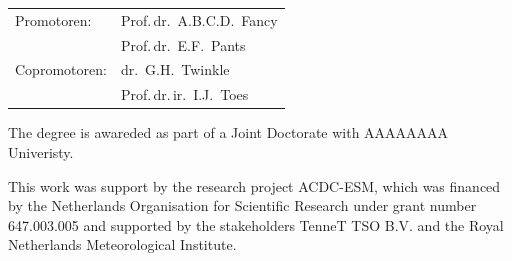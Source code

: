\begin{titlepage}


        \clearpage

        \thispagestyle{empty}

	\begin{tabular}{ll}
		Promotoren:           & Prof.\,dr.\ A.B.C.D.~Fancy \\[0.1cm]
                                                & Prof.\,dr.\ E.F.~Pants \\[0.1cm]
		Copromotoren:      & dr.\ G.H.~Twinkle \\[0.1cm]
                                                & Prof.\,dr.\,ir.\ I.J.~Toes
	\end{tabular}

        \vfill

        \noindent The degree is awareded as part of a Joint Doctorate with AAAAAAAA Univeristy.

        \vspace*{2\bigskipamount}

        \noindent This work was support by the research project ACDC-ESM, which was financed by the Netherlands Organisation for Scientific Research under grant number 647.003.005 and supported by the stakeholders TenneT TSO B.V. and the Royal
        Netherlands Meteorological Institute.


\end{titlepage}

